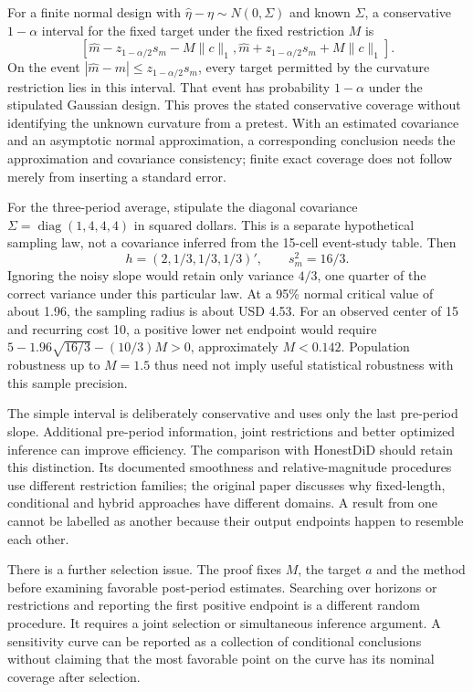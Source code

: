 For a finite normal design with
$\widehat\eta-\eta\sim N(0,\Sigma)$ and known $\Sigma$, a conservative
$1-\alpha$ interval for the fixed target under the fixed restriction $M$ is
\begin{equation}
 \left[\widehat m-z_{1-\alpha/2}s_m-M\|c\|_1,
       \widehat m+z_{1-\alpha/2}s_m+M\|c\|_1\right].
 \label{exec17:s6-normal-interval}
\end{equation}
On the event $|\widehat m-m|\leq z_{1-\alpha/2}s_m$, every target
permitted by the curvature restriction lies in this interval. That event
has probability $1-\alpha$ under the stipulated Gaussian design. This
proves the stated conservative coverage without identifying the unknown
curvature from a pretest. With an estimated covariance and an asymptotic
normal approximation, a corresponding conclusion needs the approximation
and covariance consistency; finite exact coverage does not follow merely
from inserting a standard error.

For the three-period average, stipulate the diagonal covariance
$\Sigma=\operatorname{diag}(1,4,4,4)$ in squared dollars. This is a
separate hypothetical sampling law, not a covariance inferred from the
15-cell event-study table. Then
\begin{equation}
 h=(2,1/3,1/3,1/3)',\qquad s_m^2=16/3.
 \label{exec17:s6-normal-design}
\end{equation}
Ignoring the noisy slope would retain only variance $4/3$, one quarter
of the correct variance under this particular law. At a 95\% normal
critical value of about 1.96, the sampling radius is about USD 4.53.
For an observed center of 15 and recurring cost 10, a positive lower
net endpoint would require
$5-1.96\sqrt{16/3}-(10/3)M>0$, approximately $M<0.142$.
Population robustness up to $M=1.5$ thus need not imply useful statistical
robustness with this sample precision.

The simple interval is deliberately conservative and uses only the last
pre-period slope. Additional pre-period information, joint restrictions and
better optimized inference can improve efficiency. The comparison with
HonestDiD should retain this distinction. Its documented smoothness and
relative-magnitude procedures use different restriction families; the original
paper discusses why fixed-length, conditional and hybrid approaches have
different domains. A result from one cannot be labelled as another because
their output endpoints happen to resemble each other.\citep{rambachan2023,sw_honestdid}

There is a further selection issue. The proof fixes $M$, the target $a$
and the method before examining favorable post-period estimates. Searching
over horizons or restrictions and reporting the first positive endpoint is
a different random procedure. It requires a joint selection or simultaneous
inference argument. A sensitivity curve can be reported as a collection of
conditional conclusions without claiming that the most favorable point on
the curve has its nominal coverage after selection.


